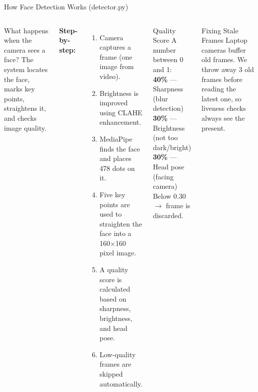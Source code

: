 \documentclass[aspectratio=169,11pt]{beamer}
\begin{document}
\begin{frame}{How Face Detection Works (detector.py)}\small
\begin{columns}[T]
\begin{block}{What happens when the camera sees a face?}
\small The system locates the face, marks key points, straightens it, and checks image quality.
\end{block}
\textbf{Step-by-step:}\\[2pt]
\footnotesize
\begin{enumerate}\setlength\itemsep{1pt}
  \item Camera captures a frame (one image from video).
  \item Brightness is improved using CLAHE enhancement.
  \item MediaPipe finds the face and places 478 dots on it.
  \item Five key points are used to straighten the face into a 160$\times$160 pixel image.
  \item A quality score is calculated based on sharpness, brightness, and head pose.
  \item Low-quality frames are skipped automatically.
\end{enumerate}
\begin{block}{Quality Score}\scriptsize
A number between 0 and 1:\\[2pt]
\textbf{40\%} --- Sharpness (blur detection)\\[1pt]
\textbf{30\%} --- Brightness (not too dark/bright)\\[1pt]
\textbf{30\%} --- Head pose (facing camera)\\[2pt]
Below 0.30 $\to$ frame is discarded.
\end{block}
\begin{block}{Fixing Stale Frames}\scriptsize
Laptop cameras buffer old frames. We throw away 3 old frames before reading the latest one, so liveness checks always see the present.
\end{block}
\end{columns}
\end{frame}
\end{document}
